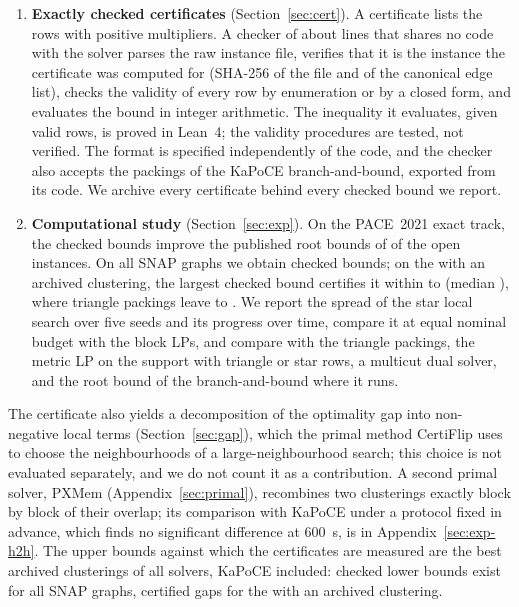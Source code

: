 \begin{enumerate}
\item \textbf{Exactly checked certificates} (Section~\ref{sec:cert}).  A
certificate lists the rows with positive multipliers.  A checker of about
\numCheckerLines{} lines that shares no code with the solver parses the raw
instance file, verifies that it is the instance the certificate was computed
for (SHA-256 of the file and of the canonical edge list), checks the validity
of every row by enumeration or by a closed form, and evaluates the bound in
integer arithmetic.  The inequality it evaluates, given valid rows, is proved
in Lean~4; the validity procedures are tested, not verified.  The format is
specified independently of the code, and the checker also accepts the
packings of the KaPoCE branch-and-bound, exported from its code.  We archive
every certificate behind every checked bound we report.

\item \textbf{Computational study} (Section~\ref{sec:exp}).  On the PACE~2021
exact track, the checked bounds improve the published root bounds of
\numPaceOpenImproved{} of the \numPaceOpen{} open instances.  On all
\numSnapTotal{} SNAP graphs we obtain checked bounds; on the \numSnapGapN{}
with an archived clustering, the largest checked bound certifies it within
\numSnapGapLo{} to \numSnapGapHi{} (median \numSnapGapMedian{}), where
triangle packings leave \numBaseGapLo{} to \numBaseGapHi{}.  We report the
spread of the star local search over five seeds and its progress over time,
compare it at equal nominal budget with the block LPs, and compare with the triangle
packings, the metric LP on the support with triangle or star rows, a
multicut dual solver, and the root bound of the branch-and-bound where it
runs.
\end{enumerate}

The certificate also yields a decomposition of the optimality gap into
non-negative local terms (Section~\ref{sec:gap}), which the primal method
CertiFlip uses to choose the neighbourhoods of a large-neighbourhood search;
this choice is not evaluated separately, and we do not count it as a
contribution.  A second primal solver, PXMem (Appendix~\ref{sec:primal}),
recombines two clusterings exactly block by block of their overlap; its
comparison with KaPoCE under a protocol fixed in advance, which finds no
significant difference at \SI{600}{s}, is in Appendix~\ref{sec:exp-h2h}.  The
upper bounds against which the certificates are measured are the best
archived clusterings of all solvers, KaPoCE included: checked lower bounds
exist for all \numSnapTotal{} SNAP graphs, certified gaps for the
\numSnapGapN{} with an archived clustering.

